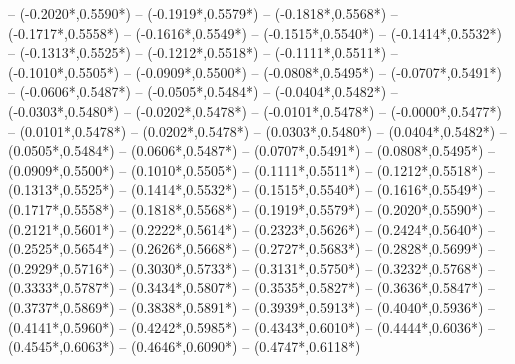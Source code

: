 {	-- ({-0.2020*\dx},{0.5590*\dy})
	-- ({-0.1919*\dx},{0.5579*\dy})
	-- ({-0.1818*\dx},{0.5568*\dy})
	-- ({-0.1717*\dx},{0.5558*\dy})
	-- ({-0.1616*\dx},{0.5549*\dy})
	-- ({-0.1515*\dx},{0.5540*\dy})
	-- ({-0.1414*\dx},{0.5532*\dy})
	-- ({-0.1313*\dx},{0.5525*\dy})
	-- ({-0.1212*\dx},{0.5518*\dy})
	-- ({-0.1111*\dx},{0.5511*\dy})
	-- ({-0.1010*\dx},{0.5505*\dy})
	-- ({-0.0909*\dx},{0.5500*\dy})
	-- ({-0.0808*\dx},{0.5495*\dy})
	-- ({-0.0707*\dx},{0.5491*\dy})
	-- ({-0.0606*\dx},{0.5487*\dy})
	-- ({-0.0505*\dx},{0.5484*\dy})
	-- ({-0.0404*\dx},{0.5482*\dy})
	-- ({-0.0303*\dx},{0.5480*\dy})
	-- ({-0.0202*\dx},{0.5478*\dy})
	-- ({-0.0101*\dx},{0.5478*\dy})
	-- ({-0.0000*\dx},{0.5477*\dy})
	-- ({0.0101*\dx},{0.5478*\dy}) %
	-- ({0.0202*\dx},{0.5478*\dy}) %
	-- ({0.0303*\dx},{0.5480*\dy}) %
	-- ({0.0404*\dx},{0.5482*\dy}) %
	-- ({0.0505*\dx},{0.5484*\dy}) %
	-- ({0.0606*\dx},{0.5487*\dy}) %
	-- ({0.0707*\dx},{0.5491*\dy}) %
	-- ({0.0808*\dx},{0.5495*\dy}) %
	-- ({0.0909*\dx},{0.5500*\dy}) %
	-- ({0.1010*\dx},{0.5505*\dy}) %
	-- ({0.1111*\dx},{0.5511*\dy}) %
	-- ({0.1212*\dx},{0.5518*\dy}) %
	-- ({0.1313*\dx},{0.5525*\dy}) %
	-- ({0.1414*\dx},{0.5532*\dy}) %
	-- ({0.1515*\dx},{0.5540*\dy}) %
	-- ({0.1616*\dx},{0.5549*\dy}) %
	-- ({0.1717*\dx},{0.5558*\dy}) %
	-- ({0.1818*\dx},{0.5568*\dy}) %
	-- ({0.1919*\dx},{0.5579*\dy}) %
	-- ({0.2020*\dx},{0.5590*\dy}) %
	-- ({0.2121*\dx},{0.5601*\dy}) %
	-- ({0.2222*\dx},{0.5614*\dy}) %
	-- ({0.2323*\dx},{0.5626*\dy}) %
	-- ({0.2424*\dx},{0.5640*\dy}) %
	-- ({0.2525*\dx},{0.5654*\dy}) %
	-- ({0.2626*\dx},{0.5668*\dy}) %
	-- ({0.2727*\dx},{0.5683*\dy}) %
	-- ({0.2828*\dx},{0.5699*\dy}) %
	-- ({0.2929*\dx},{0.5716*\dy}) %
	-- ({0.3030*\dx},{0.5733*\dy}) %
	-- ({0.3131*\dx},{0.5750*\dy}) %
	-- ({0.3232*\dx},{0.5768*\dy}) %
	-- ({0.3333*\dx},{0.5787*\dy}) %
	-- ({0.3434*\dx},{0.5807*\dy}) %
	-- ({0.3535*\dx},{0.5827*\dy}) %
	-- ({0.3636*\dx},{0.5847*\dy}) %
	-- ({0.3737*\dx},{0.5869*\dy}) %
	-- ({0.3838*\dx},{0.5891*\dy}) %
	-- ({0.3939*\dx},{0.5913*\dy}) %
	-- ({0.4040*\dx},{0.5936*\dy}) %
	-- ({0.4141*\dx},{0.5960*\dy}) %
	-- ({0.4242*\dx},{0.5985*\dy}) %
	-- ({0.4343*\dx},{0.6010*\dy}) %
	-- ({0.4444*\dx},{0.6036*\dy}) %
	-- ({0.4545*\dx},{0.6063*\dy}) %
	-- ({0.4646*\dx},{0.6090*\dy}) %
	-- ({0.4747*\dx},{0.6118*\dy}) %
}
